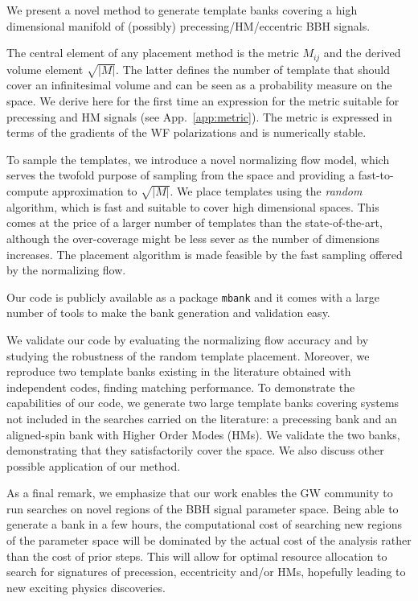 \documentclass[twocolumn,showpacs,preprintnumbers,nofootinbib,prd,
superscriptaddress,10pt]{revtex4-2}
\begin{document}
We present a novel method to generate template banks covering a high dimensional manifold of (possibly) precessing/HM/eccentric BBH signals.

The central element of any placement method is the metric $M_{ij}$ and the derived volume element $\sqrt{|M|}$. The latter defines the number of template that should cover an infinitesimal volume and can be seen as a probability measure on the space.
We derive here for the first time an expression for the metric suitable for precessing and HM signals (see App.~\ref{app:metric}). The metric is expressed in terms of the gradients of the WF polarizations and is numerically stable.

To sample the templates, we introduce a novel normalizing flow model, which serves the twofold purpose of sampling from the space and providing a fast-to-compute approximation to $\sqrt{|M|}$.
We place templates using the {\it random} algorithm, which is fast and suitable to cover high dimensional spaces. This comes at the price of a larger number of templates than the state-of-the-art, although the over-coverage might be less sever as the number of dimensions increases.
The placement algorithm is made feasible by the fast sampling offered by the normalizing flow.

Our code is publicly available as a package \texttt{mbank} and it comes with a large number of tools to make the bank generation and validation easy.

We validate our code by evaluating the normalizing flow accuracy and by studying the robustness of the random template placement.
Moreover, we reproduce two template banks existing in the literature obtained with independent codes, finding matching performance.
To demonstrate the capabilities of our code, we generate two large template banks covering systems not included in the searches carried on the literature: a precessing bank and an aligned-spin bank with Higher Order Modes (HMs). We validate the two banks, demonstrating that they satisfactorily cover the space.
We also discuss other possible application of our method.

As a final remark, we emphasize that our work enables the GW community to run searches on novel regions of the BBH signal parameter space. Being able to generate a bank in a few hours, the computational cost of searching new regions of the parameter space will be dominated by the actual cost of the analysis rather than the cost of prior steps.
This will allow for optimal resource allocation to search for signatures of precession, eccentricity and/or HMs, hopefully leading to new exciting physics discoveries.
\end{document}
